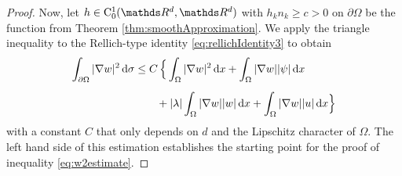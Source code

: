 \begin{proof}
  Now, let $h \in \CC_0^1(\R^d, \R^d)$ with $h_k n_k \geq c > 0$ on $\partial \Omega$ be the function from Theorem \ref{thm:smoothApproximation}.
  We apply the triangle inequality to the Rellich-type identity \eqref{eq:rellichIdentity3} to obtain
  \begin{align}
\label{eq:rellichInequality3}
      \begin{alignedat}{2}
    \int_{\partial\Omega} |\nabla w|^2 \, {\operatorname{d}\!{\sigma}} 
    &\leq C \, \Big\{ \int_\Omega |\nabla w|^2 \, {\operatorname{d}\!{x}} + \int_\Omega |\nabla w | |\psi| \, {\operatorname{d}\!{x}} \\[0.5em]
    &\qquad + |\lambda| \int_\Omega |\nabla w| |w| \, {\operatorname{d}\!{x}} + \int_\Omega |\nabla w| |u| \, {\operatorname{d}\!{x}} \Big\}
\end{alignedat}
  \end{align}
  with a constant $C$ that only depends on $d$ and the Lipschitz character of $\Omega$.
  The left hand side of this estimation establishes the starting point for the proof of inequality \ref{eq:w2estimate}.


\end{proof}
